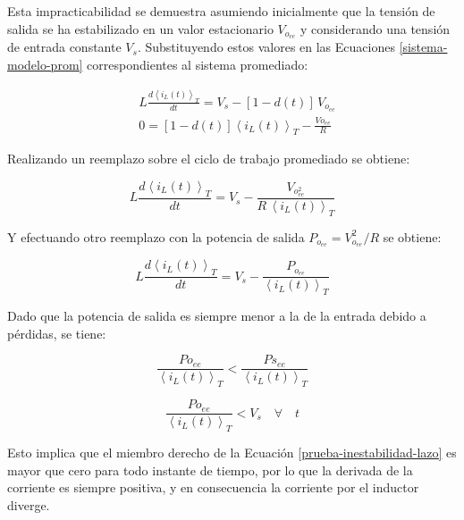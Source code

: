 Esta impracticabilidad se demuestra asumiendo inicialmente que la tensión de salida se ha estabilizado en un valor estacionario $V_{o_{ee}}$ y considerando una tensión de entrada constante $V_s$. Substituyendo estos valores en las Ecuaciones \ref{sistema-modelo-prom} correspondientes al sistema promediado:

\begin{equation*}
  \begin{split}
    & L \frac{d\left\langle i_L(t) \right\rangle_T}{dt} = V_s - \left[1-d(t)\right] \, V_{o_{ee}}
    \\
    & 0 = \left[1-d(t)\right] \left\langle i_L(t) \right\rangle_T - \frac{V{o_{ee}}}{R}
  \end{split}
\end{equation*}

Realizando un reemplazo sobre el ciclo de trabajo promediado se obtiene:

\begin{equation}
  L \frac{d\left\langle i_L(t) \right\rangle_T}{dt} = V_s - \frac{V_{o_{ee}^2}}{R \, \left\langle i_L(t) \right\rangle_T}
  \label{prueba-inestabilidad-lazo}
\end{equation}

Y efectuando otro reemplazo con la potencia de salida $P_{o_{ee}} = V_{o_{ee}}^2/R$ se obtiene:

\begin{equation*}
  L \frac{d\left\langle i_L(t) \right\rangle_T}{dt} = V_s - \frac{P_{o_{ee}}}{\left\langle i_L(t) \right\rangle_T}
\end{equation*}

Dado que la potencia de salida es siempre menor a la de la entrada debido a pérdidas, se tiene:

\begin{equation*}
  \frac{P{o_{ee}}}{\left\langle i_L(t) \right\rangle_T} < \frac{P{s_{ee}}}{\left\langle i_L(t) \right\rangle_T}
\end{equation*}

\begin{equation*}
  \boxed{\frac{P{o_{ee}}}{\left\langle i_L(t) \right\rangle_T} < V_s \quad \forall \quad t}
\end{equation*}

Esto implica que el miembro derecho de la Ecuación \ref{prueba-inestabilidad-lazo} es mayor que cero para todo instante de tiempo, por lo que la derivada de la corriente es siempre positiva, y en consecuencia la corriente por el inductor diverge. 


